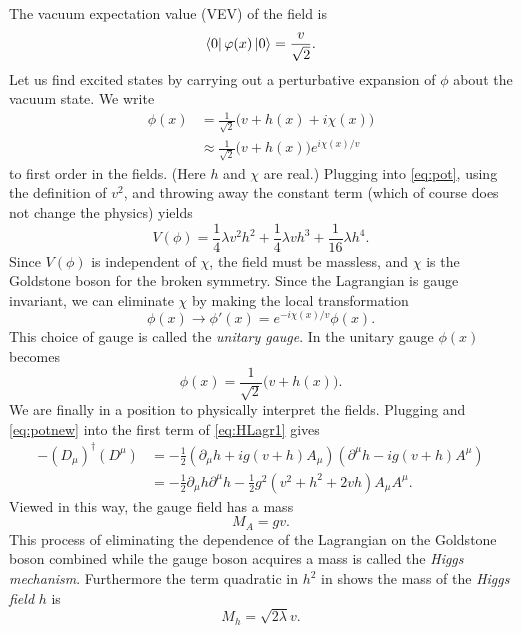 The vacuum expectation value (VEV) of the field is
\begin{equation}
  \bra{0}\varphi(x)\ket{0}=\frac{v}{\sqrt{2}}.
\end{equation}
Let us find excited states by carrying out a perturbative expansion of $\phi$ 
about the vacuum state. We write
\begin{equation}
  \label{eq:phixpand}
  \begin{aligned}
  \phi(x)&=\frac{1}{\sqrt{2}}\big(v+h(x)+i\chi(x)\big) \\
         &\approx\frac{1}{\sqrt{2}}\big(v+h(x)\big)
                  e^{i\chi(x)/v}
  \end{aligned}
\end{equation}
to first order in the fields. (Here $h$ and $\chi$ are real.) Plugging 
 into \eqref{eq:pot}, using the definition of 
$v^2$, and throwing away the constant term (which of course does not change the 
physics) yields
\begin{equation}
  \label{eq:potnew}
  V(\phi)=\frac{1}{4}\lambda v^{2}h^{2}+\frac{1}{4}\lambda vh^{3}
          +\frac{1}{16}\lambda h^{4}.
\end{equation}
Since $V(\phi)$ is independent of $\chi$, the field must be massless,
and $\chi$ is the Goldstone boson for the broken symmetry. Since the
Lagrangian is gauge invariant, we can eliminate $\chi$ by making the
local transformation
\begin{equation}
  \phi(x)\to\phi'(x)=e^{-i\chi(x)/v}\phi(x).
\end{equation}
This choice of gauge is called the {\it unitary gauge}. 
In the unitary gauge
$\phi(x)$ becomes
\begin{equation}
  \label{eq:phinew}
  \phi(x)=\frac{1}{\sqrt{2}}\big(v+h(x)\big).
\end{equation}
We are finally in a position to physically interpret the fields. Plugging 
 and \eqref{eq:potnew} into the first term of 
\eqref{eq:HLagr1} gives
\begin{equation}
  \label{eq:kin}
  \begin{aligned}
    -(D_{\mu})^{\dagger}(D^{\mu})&=-\frac{1}{2}(\partial_{\mu}h+ig(v+h)A_{\mu})
                                (\partial^{\mu}h-ig(v+h)A^{\mu}) \\
         &=-\frac{1}{2}\partial_{\mu}h\partial^{\mu}h 
           -\frac{1}{2}g^{2}(v^{2}+h^{2}+2vh)A_{\mu}A^{\mu}. 
  \end{aligned}
\end{equation} 
Viewed in this way, the gauge field has a mass
\begin{equation}
  M_{A}=gv.
\end{equation}
This process of eliminating the dependence of the Lagrangian on the Goldstone
boson combined while the gauge boson acquires a mass is called the {\it Higgs
mechanism}. Furthermore the term quadratic in 
$h^2$ in  shows the mass of the {\it Higgs field} 
$h$ is
\begin{equation}
  M_{h}=\sqrt{2\lambda}v.
\end{equation}

